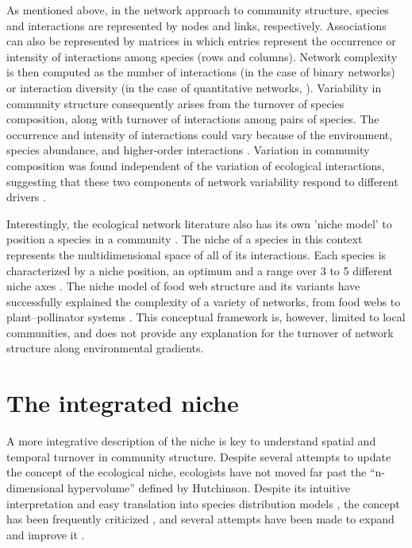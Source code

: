 \documentclass[12pt]{article}
\begin{document}
As mentioned above, in the network approach to community structure, species
and interactions are represented by nodes and links, respectively.
Associations can also be represented by matrices in which entries represent
the occurrence or intensity of interactions among species (rows and columns).
Network complexity is then computed as the number of interactions (in the case
of binary networks) or interaction diversity (in the case of quantitative
networks, \citealt{Bersier2002}). Variability in community structure
consequently arises from the turnover of species composition, along with
turnover of interactions among pairs of species. The occurrence and intensity
of interactions could vary because of the environment, species abundance, and
higher-order interactions \citep{Poisot2015a}. Variation in community
composition was found independent of the variation of ecological interactions,
suggesting that these two components of network variability respond to
different drivers \citep{Poisot2012}.

Interestingly, the ecological network literature also has its own ’niche
model’ to position a species in a community \citep{Williams2000}. The niche of a
species in this context represents the multidimensional space of all of its
interactions. Each species is characterized by a niche position, an optimum
and a range over 3 to 5 different niche axes \citep{Williams2000, Eklof2013}.
The niche model of food web structure and its variants have successfully explained the
complexity of a variety of networks, from food webs to plant–pollinator
systems \citep{Allesina2008, Williams2010, Eklof2013}. This
conceptual framework is, however, limited to local communities, and does not
provide any explanation for the turnover of network structure along
environmental gradients.

\section*{The integrated niche}

A more integrative description of the niche is key to understand spatial and
temporal turnover in community structure. Despite several attempts to update
the concept of the ecological niche, ecologists have not moved far past the
``n-dimensional hypervolume'' defined by Hutchinson. Despite its intuitive
interpretation and easy translation into species distribution models
\citep{Boulangeat2012, Blonder2014}, the concept has been frequently
criticized \citep{Hardin1960, Peters1991, Silvertown2004}, and several
attempts have been made to expand and improve it \citep{Pulliam2000,
Chase2003, Soberon2007, Holt2009, McInerny2012b}.
\end{document}
